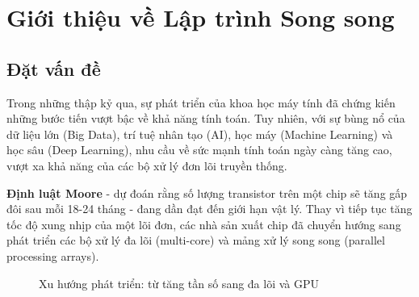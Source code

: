 \chapter{Giới thiệu về Lập trình Song song}
\label{chap:introduction}

\section{Đặt vấn đề}

Trong những thập kỷ qua, sự phát triển của khoa học máy tính đã chứng kiến những bước tiến vượt bậc về khả năng tính toán. Tuy nhiên, với sự bùng nổ của dữ liệu lớn (Big Data), trí tuệ nhân tạo (AI), học máy (Machine Learning) và học sâu (Deep Learning), nhu cầu về sức mạnh tính toán ngày càng tăng cao, vượt xa khả năng của các bộ xử lý đơn lõi truyền thống.

\textbf{Định luật Moore} - dự đoán rằng số lượng transistor trên một chip sẽ tăng gấp đôi sau mỗi 18-24 tháng - đang dần đạt đến giới hạn vật lý. Thay vì tiếp tục tăng tốc độ xung nhịp của một lõi đơn, các nhà sản xuất chip đã chuyển hướng sang phát triển các bộ xử lý đa lõi (multi-core) và mảng xử lý song song (parallel processing arrays).

\begin{figure}[H]
\centering
{}
\caption{Xu hướng phát triển: từ tăng tần số sang đa lõi và GPU}
\label{fig:trend}
\end{figure}

